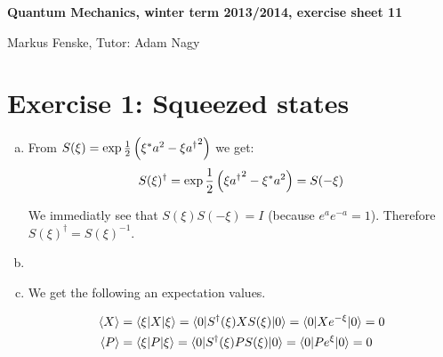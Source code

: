 \documentclass[a4paper,german,12pt,smallheadings]{scrartcl}
\begin{document}
\allowdisplaybreaks %
\begin{center}
\bfseries %
\sffamily %
\vspace{-40pt}
Quantum Mechanics, winter term 2013/2014, exercise sheet 11

Markus Fenske, Tutor: Adam Nagy
\vspace{-10pt}
\end{center}

\section*{Exercise 1: Squeezed states}
\begin{enumerate}[a)]
  \item
    From $S(\xi) = \exp \frac{1}{2} \del{\xi^* a^2 - \xi {a^\dagger}^2}$ we get:
    \begin{align*}
      S(\xi)^\dagger = \exp \frac{1}{2} \del{\xi {a^\dagger}^2 - \xi^* a^2} = S(-\xi)
    \end{align*}

    We immediatly see that $S(\xi)S(-\xi) = I$ (because $e^a e^{-a} = 1$).
    Therefore $S(\xi)^\dagger = S(\xi)^{-1}$.
  \item
  \item
    We get the following an expectation values.

    \begin{align*}
      \braket{X}
      &= \braket{\xi|X|\xi}
      = \braket{0|S^\dagger(\xi)XS(\xi)|0}
      = \braket{0|X e^{-\xi}|0}
      = 0
      \\
      \braket{P}
      &= \braket{\xi|P|\xi}
      = \braket{0|S^\dagger(\xi)PS(\xi)|0}
      = \braket{0|P e^{\xi}|0}
      = 0
    \end{align*}


\end{enumerate}
\end{document}
